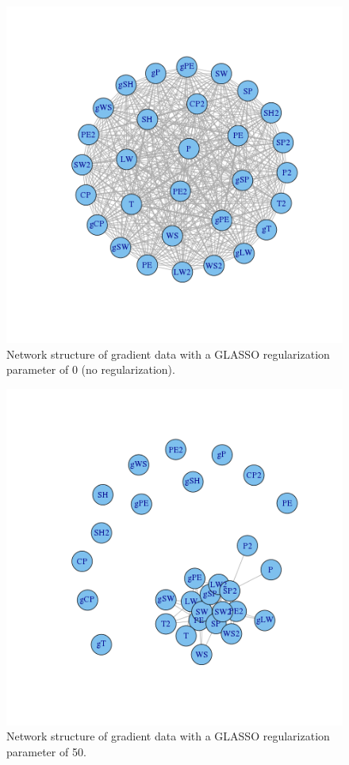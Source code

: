 \documentclass{article}
\begin{document}
\begin{figure}
\includegraphics[width=0.9\columnwidth]{images/grad_0.png}
\caption{Network structure of gradient data with a GLASSO regularization parameter of 0 (no regularization).}
\label{fig:grad_0}
\end{figure}

\begin{figure}
\includegraphics[width=0.9\columnwidth]{images/grad_50.png}
\caption{Network structure of gradient data with a GLASSO regularization parameter of 50.}
\label{fig:grad_50}
\end{figure}
\end{document}
